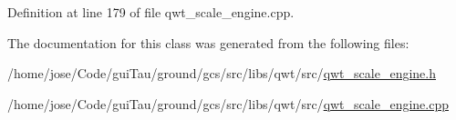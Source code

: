 Definition at line 179 of file qwt\-\_\-scale\-\_\-engine.\-cpp.



The documentation for this class was generated from the following files\-:\begin{DoxyCompactItemize}
\item 
/home/jose/\-Code/gui\-Tau/ground/gcs/src/libs/qwt/src/\hyperlink{qwt__scale__engine_8h}{qwt\-\_\-scale\-\_\-engine.\-h}\item 
/home/jose/\-Code/gui\-Tau/ground/gcs/src/libs/qwt/src/\hyperlink{qwt__scale__engine_8cpp}{qwt\-\_\-scale\-\_\-engine.\-cpp}\end{DoxyCompactItemize}

